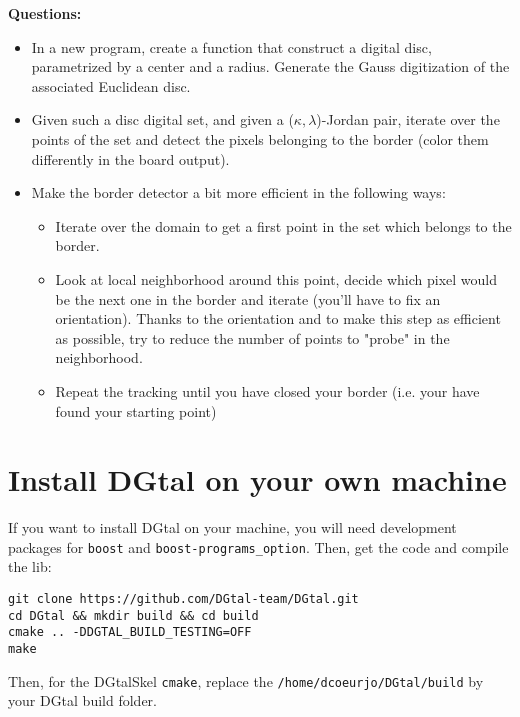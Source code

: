 \documentclass[a4paper, 11pt]{article}
\begin{document}
\noindent \textbf{Questions:}
\begin{itemize}
	\item In a new program, create a function that construct a digital disc, parametrized by a center and a radius. Generate the Gauss digitization of the associated Euclidean disc.

	\item Given such a disc digital set, and given a ($\kappa,\lambda$)-Jordan pair, iterate over the points of the set and detect the pixels belonging to the border (color them differently in the board output).

	\item Make the border detector a bit more efficient in the following ways:
	\begin{itemize}
		\item Iterate over the domain to get a first point in the set which belongs to the border.
		\item Look at local neighborhood around this point, decide which pixel would be the next one in the border and iterate (you'll have to fix an orientation). Thanks to the orientation and to make this step as efficient as possible, try to reduce the number of points to "probe" in the neighborhood.
		\item Repeat the tracking until you have closed your border (i.e. your have found your starting point)
	\end{itemize}
\end{itemize}


\appendix
\section*{Install DGtal on your own machine}

\par If you want to install DGtal on your machine, you will need development  packages for \texttt{boost} and \texttt{boost-programs\_option}. Then, get the code and compile the lib:
\begin{verbatim}
git clone https://github.com/DGtal-team/DGtal.git
cd DGtal && mkdir build && cd build
cmake .. -DDGTAL_BUILD_TESTING=OFF
make
\end{verbatim}
\par Then, for the DGtalSkel \texttt{cmake}, replace the \texttt{/home/dcoeurjo/DGtal/build} by your DGtal build folder.
\end{document}
